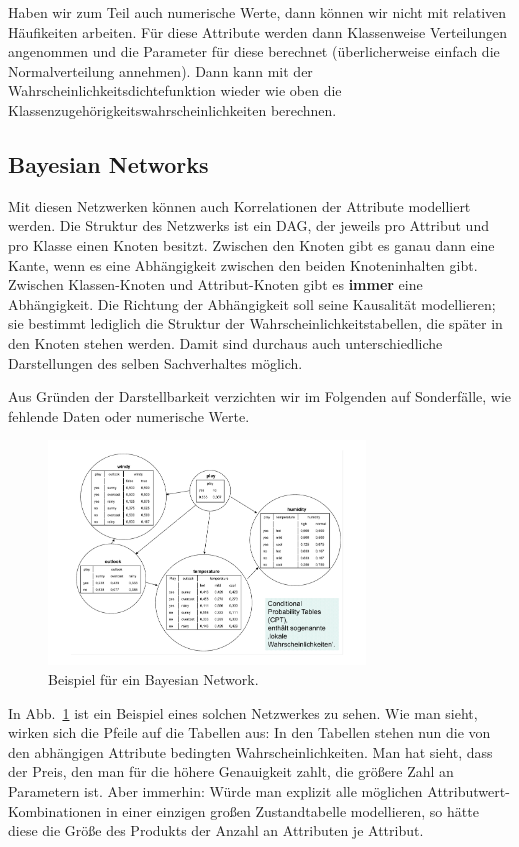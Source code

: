 Haben wir zum Teil auch numerische Werte, dann können wir nicht
mit relativen Häufikeiten arbeiten. Für diese Attribute werden dann
Klassenweise Verteilungen angenommen und die Parameter für diese
berechnet (überlicherweise einfach die Normalverteilung annehmen).
Dann kann mit der Wahrscheinlichkeitsdichtefunktion wieder wie oben
die Klassenzugehörigkeitswahrscheinlichkeiten berechnen.

\subsection{Bayesian Networks}
Mit diesen Netzwerken können auch Korrelationen der Attribute
modelliert werden. Die Struktur des Netzwerks ist ein DAG, der jeweils
pro Attribut und pro Klasse einen Knoten besitzt. Zwischen den Knoten
gibt es ganau dann eine Kante, wenn es eine Abhängigkeit zwischen den 
beiden Knoteninhalten gibt. Zwischen Klassen-Knoten und
Attribut-Knoten gibt es \textbf{immer} eine Abhängigkeit. Die Richtung
der Abhängigkeit soll seine Kausalität modellieren; sie bestimmt lediglich
die Struktur der Wahrscheinlichkeitstabellen, die später in den Knoten
stehen werden. Damit sind durchaus auch unterschiedliche Darstellungen
des selben Sachverhaltes möglich.

Aus Gründen der Darstellbarkeit verzichten wir im Folgenden auf
Sonderfälle, wie fehlende Daten oder numerische Werte.

\begin{figure}[htbp]
	\centering
	\includegraphics[width=0.75\textwidth]{Figures/cpt}
	\caption[BN Beispiel]{Beispiel für ein Bayesian Network. \footnotemark}
	\label{fig:cpt}
\end{figure}

In Abb.~\ref{fig:cpt} ist ein Beispiel eines solchen Netzwerkes zu sehen.
Wie man sieht, wirken sich die Pfeile auf die Tabellen aus: In den
Tabellen stehen nun die von den abhängigen Attribute bedingten 
Wahrscheinlichkeiten. Man hat sieht, dass der Preis, den man für
die höhere Genauigkeit zahlt, die größere Zahl an Parametern ist.
Aber immerhin: Würde man explizit alle möglichen Attributwert-
Kombinationen in einer einzigen großen Zustandtabelle modellieren,
so hätte diese die Größe des Produkts der Anzahl an Attributen je
Attribut.


